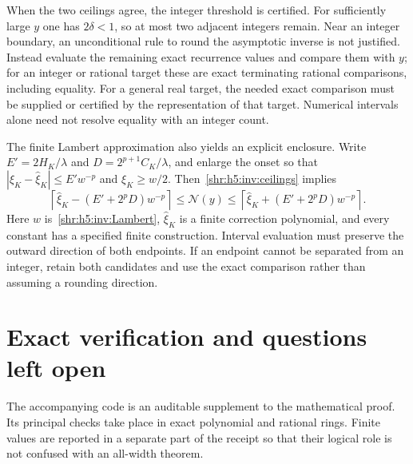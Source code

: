 \documentclass[11pt,letterpaper]{article}
\numberwithin{equation}{section}
\theoremstyle{definition}
\newcommand{\1}{\mathbf 1}
\begin{document}
When the two ceilings agree, the integer threshold is certified. For
sufficiently large $y$ one has $2\delta<1$, so at most two adjacent integers
remain. Near an integer boundary, an unconditional rule to round the
asymptotic inverse is not justified. Instead evaluate the remaining exact
recurrence values and compare them with $y$; for an integer or rational
target these are exact terminating rational comparisons, including equality.
For a general real target, the needed exact comparison must be supplied
or certified by the representation of that target. Numerical intervals
alone need not resolve equality with an integer count.

The finite Lambert approximation also yields an explicit enclosure. Write
$E'=2H_K/\lambda$ and $D=2^{p+1}C_K/\lambda$, and enlarge the onset so that
$|\xi_K-\widehat\xi_K|\le E'w^{-p}$ and $\xi_K\ge w/2$.
Then~\eqref{shr:h5:inv:ceilings} implies
\begin{equation}
 \left\lceil\widehat\xi_K-(E'+2^pD)w^{-p}\right\rceil
 \le\mathcal N(y)\le
 \left\lceil\widehat\xi_K+(E'+2^pD)w^{-p}\right\rceil.
 \label{shr:h5:inv:Lambertceilings}
\end{equation}
Here $w$ is~\eqref{shr:h5:inv:Lambert}, $\widehat\xi_K$ is a finite correction
polynomial, and every constant has a specified finite construction.
Interval evaluation must preserve the outward direction of both endpoints.
If an endpoint cannot be separated from an integer, retain both candidates
and use the exact comparison rather than assuming a rounding direction.

\section{Exact verification and questions left open}
\label{shr:h5:sec:verification}
The accompanying code is an auditable supplement to the mathematical
proof. Its principal checks take place in exact polynomial and rational
rings. Finite values are reported in a separate part of the receipt so
that their logical role is not confused with an all-width theorem.
\end{document}
